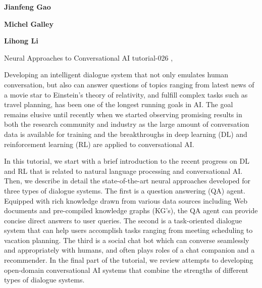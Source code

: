 \begin{bio}
{\bfseries Jianfeng Gao} 

{\bfseries Michel Galley} 

{\bfseries Lihong Li} 

\end{bio}

\begin{tutorial}
  {Neural Approaches to Conversational AI}
  {tutorial-026}
  {\daydateyear, \tutorialmorningtime}
  {\TutLocB}

Developing an intelligent dialogue system that not only emulates human conversation, but also can answer questions of topics ranging from latest news of a movie star to Einstein’s theory of relativity, and fulfill complex tasks such as travel planning, has been one of the longest running goals in AI. The goal remains elusive until recently when we started observing promising results in both the research community and industry as the large amount of conversation data is available for training and the breakthroughs in deep learning (DL) and reinforcement learning (RL) are applied to conversational AI.

In this tutorial, we start with a brief introduction to the recent progress on DL and RL that is related to natural language processing and conversational AI. Then, we describe in detail the state-of-the-art neural approaches developed for three types of dialogue systems. The first is a question answering (QA) agent. Equipped with rich knowledge drawn from various data sources including Web documents and pre-compiled knowledge graphs (KG’s), the QA agent can provide concise direct answers to user queries. The second is a task-oriented dialogue system that can help users accomplish tasks ranging from meeting scheduling to vacation planning. The third is a social chat bot which can converse seamlessly and appropriately with humans, and often plays roles of a chat companion and a recommender. In the final part of the tutorial, we review attempts to developing open-domain conversational AI systems that combine the strengths of different types of dialogue systems.


\end{tutorial}
